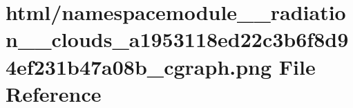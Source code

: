 \hypertarget{namespacemodule____radiation____clouds__a1953118ed22c3b6f8d94ef231b47a08b__cgraph_8png}{}\section{html/namespacemodule\+\_\+\+\_\+radiation\+\_\+\+\_\+clouds\+\_\+a1953118ed22c3b6f8d94ef231b47a08b\+\_\+cgraph.png File Reference}
\label{namespacemodule____radiation____clouds__a1953118ed22c3b6f8d94ef231b47a08b__cgraph_8png}
